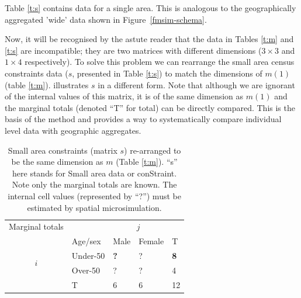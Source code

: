 \documentclass[a4paper, 11pt, twoside]{article}
\begin{document}
Table \ref{t:s} contains data for a single area. This is analogous to the
geographically aggregated 'wide' data shown in Figure~\ref{fmsim-schema}.

\begin{table}[H]
\end{table}

Now, it will be recognised by the astute reader that the data in
Tables \ref{t:m} and \ref{t:s} are incompatible; they are
two matrices with different dimensions ($3 \times 3$ and $1 \times 4$ respectively).
To solve this problem we can rearrange the small area census constraints data
($s$, presented in Table \ref{t:s}) to match the dimensions of
$m(1)$ (table \ref{t:m}).
 illustrates $s$ in a different form.
Note that although we are ignorant of the internal values of this matrix,
it is of the same dimension as $m(1)$ and the marginal totals (denoted ``T'' for
total) can be directly compared. This is the basis of the method and provides a
way to systematically compare individual level data with geographic aggregates.

\begin{table}[h]
\centering
\caption[Small area constraints expressed as marginal totals]{Small
area constraints (matrix $s$) re-arranged to be the same dimension as $m$ (Table \ref{t:m}).
``s'' here stands for Small area data or conStraint. Note only
the marginal totals are known. The internal cell
values (represented by ``?'') must be estimated by spatial microsimulation.
}
\begin{tabular}{cllll}\toprule
Marginal totals&  & \multicolumn{2}{c}{$j$} & \\
& Age/sex & Male & Female & T\\ \midrule
\multirow{2}{*}{$i$} & Under-50 & \textbf{?} & ? & \textbf{\color{blue}8}\\
& Over-50 & ? & ? &4 \\
& T & 6 & 6 &12\\
\bottomrule
\end{tabular}
\label{t:s2}
\end{table}
\end{document}
